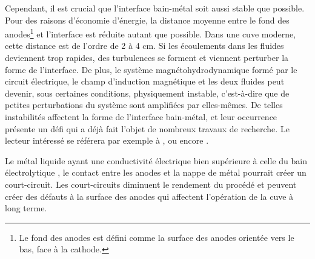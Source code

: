 Cependant, il est crucial que l'interface bain-métal soit aussi stable
que possible. Pour des raisons d'économie d'énergie, la distance
moyenne entre le fond des anodes\footnote{Le fond des anodes est
  défini comme la surface des anodes orientée vers
  le bas, face à la cathode.} et l'interface est réduite
autant que possible. Dans une cuve moderne, cette distance est de
l'ordre de \num{2} à \num{4} \si{\centi\meter}. Si les écoulements
dans les fluides deviennent trop rapides, des turbulences se forment
et viennent perturber la forme de l'interface. De plus, le système
magnétohydrodynamique formé par le circuit électrique, le champ
d'induction magnétique et les deux fluides peut devenir, sous
certaines conditions, physiquement instable, c'est-à-dire que de
petites perturbations du système sont amplifiées par elles-mêmes. De
telles instabilités affectent la forme de l'interface bain-métal, et
leur occurrence présente un défi qui a déjà fait l'objet de nombreux
travaux de recherche. Le lecteur intéressé se référera par exemple à
\cite{Descloux1998}, \cite{Sneyd1985} ou encore \cite{Maillard1996}.

Le métal liquide ayant une conductivité électrique bien supérieure à
celle du bain électrolytique \cite{Wang1992,Apfelbaum2003},
le contact entre les anodes et la nappe de métal pourrait créer un
court-circuit. Les court-circuits diminuent le rendement du procédé et
peuvent créer des défauts à la surface des anodes qui affectent
l'opération de la cuve à long terme.

